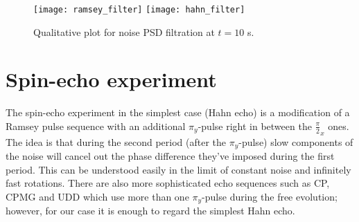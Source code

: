 \documentclass[12pt, twoside]{report}
\numberwithin{equation}{section}
\begin{document}
\begin{figure}
\centering
\texttt{[image: ramsey\_filter]}\quad
\texttt{[image: hahn\_filter]}
\caption{Qualitative plot for noise PSD filtration at $t=10$ s.}
\end{figure}

\section{Spin-echo experiment}

The spin-echo experiment in the simplest case (Hahn echo) is a modification of a Ramsey pulse sequence with an additional $\pi_y$-pulse right in between the $\frac{\pi}{2}_x$ ones. The idea is that during the second period (after the $\pi_y$-pulse)  slow components of the noise will cancel out the phase difference they've imposed during the first period. This can be understood easily in the limit of constant noise and infinitely fast rotations. There are also more sophisticated echo sequences such as CP, CPMG and UDD\cite{Bylander2011} which use more than one $\pi_y$-pulse during the free evolution; however, for our case it is enough to regard the simplest Hahn echo.
\end{document}
